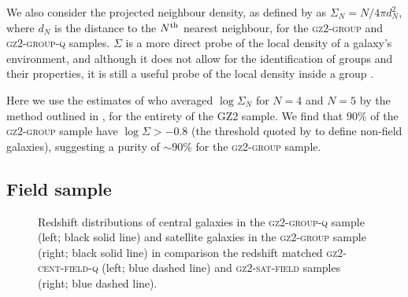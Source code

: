 \documentclass[useAMS,usenatbib]{mn2e}
\begin{document}
We also consider the projected neighbour density, as defined by \cite{Baldry06} as $\Sigma_N = N/4\pi d_N^2$, where $d_N$ is the distance to the $N^{\rm{th}}$ nearest neighbour, for the \textsc{gz2-group} and \textsc{gz2-group-q} samples. $\Sigma$ is a more direct probe of the local density of a galaxy's environment, and although it does not allow for the identification of groups and their properties, it is still a useful probe of the local density inside a group  \cite[see][for a comparison of various environment parametrisations]{muldrew12}.

Here we use the estimates of \cite{Bamford09} who averaged $\log\Sigma_N$ for $N = 4$ and $N=5$ by the method outlined in \citet{Baldry06}, for the entirety of the GZ2 sample. We find that $90\%$ of the \textsc{gz2-group} sample have $\log\Sigma > -0.8$ (the threshold quoted by \citealt{Baldry06} to define non-field galaxies), suggesting a purity of $\sim90\%$ for the \textsc{gz2-group} sample.

\subsection{Field sample}\label{sec:field}

\begin{figure}
\caption[Redshift distribution of galaxies in the \textsc{gz2-group} and \textsc{gz2-group-q} samples]{Redshift distributions of central galaxies in the \textsc{gz2-group-q} sample (left; black solid line) and satellite galaxies in the \textsc{gz2-group} sample (right; black solid line) in comparison the redshift matched \textsc{gz2-cent-field-q} (left; blue dashed line) and \textsc{gz2-sat-field} samples (right; blue dashed line).}
\label{fig:zcompare}
\end{figure}
\end{document}
